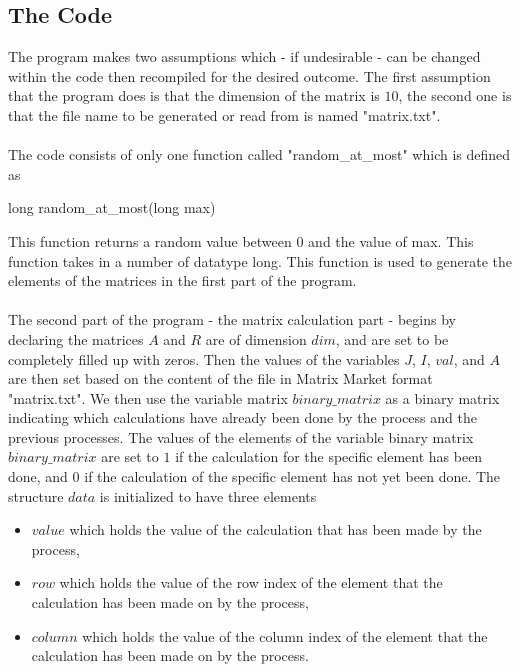 \documentclass[11pt]{article}
\theoremstyle{definition}
\begin{document}
\subsection{The Code}
The program makes two assumptions which - if undesirable - can be changed within the code then recompiled for the desired outcome. The first assumption that the program does is that the dimension of the matrix is $10$, the second one is that the file name to be generated or read from is named "matrix.txt".\\\\
The code consists of only one function called "random\_at\_most" which is defined as
\begin{center}
long random\_at\_most(long max)
\end{center}
This function returns a random value between $0$ and the value of max. This function takes in a number of datatype long. This function is used to generate the elements of the matrices in the first part of the program.\\\\
The second part of the program - the matrix calculation part - begins by declaring the matrices $A$ and $R$ are of dimension $dim$, and are set to be completely filled up with zeros. Then the values of the variables $J$, $I$, $val$, and $A$ are then set based on the content of the file in Matrix Market format "matrix.txt". We then use the variable matrix $binary\_matrix$ as a binary matrix indicating which calculations have already been done by the process and the previous processes. The values of the elements of the variable binary matrix $binary\_matrix$ are set to $1$ if the calculation for the specific element has been done, and $0$ if the calculation of the specific element has not yet been done. The structure $data$ is initialized to have three elements
\begin{itemize}
\item $value$ which holds the value of the calculation that has been made by the process,
\item $row$ which holds the value of the row index of the element that the calculation has been made on by the process,
\item $column$ which holds the value of the column index of the element that the calculation has been made on by the process.
\end{itemize}
\end{document}
